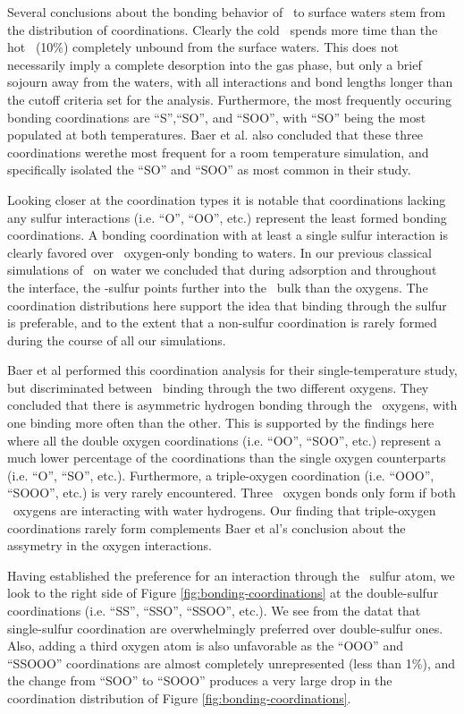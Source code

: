 	Several conclusions about the bonding behavior of \suldiox~to surface waters stem from the distribution of coordinations. Clearly the cold \suldiox~spends more time than the hot \suldiox~(10\%) completely unbound from the surface waters. This does not necessarily imply a complete desorption into the gas phase, but only a brief sojourn away from the waters, with all interactions and bond lengths longer than the cutoff criteria set for the analysis. Furthermore, the most frequently occuring bonding coordinations are ``S'',``SO'', and ``SOO'', with ``SO'' being the most populated at both temperatures. Baer et al. also concluded that these three coordinations werethe most frequent for a room temperature simulation, and specifically isolated the ``SO'' and ``SOO'' as most common in their study.\cite{Baer2010}

	Looking closer at the coordination types it is notable that coordinations lacking any sulfur interactions (i.e. ``O'', ``OO'', etc.) represent the least formed bonding coordinations. A bonding coordination with at least a single sulfur interaction is clearly favored over \suldiox~oxygen-only bonding to waters. In our previous classical simulations of \suldiox~on water we concluded that during adsorption and throughout the interface, the \suldiox-sulfur points further into the \wat~bulk than the oxygens.\cite{Shamay2011} The coordination distributions here support the idea that binding through the sulfur is preferable, and to the extent that a non-sulfur coordination is rarely formed during the course of all our simulations.

Baer et al performed this coordination analysis for their single-temperature study, but discriminated between \suldiox~binding through the two different oxygens. They concluded that there is asymmetric hydrogen bonding through the \suldiox~oxygens, with one binding more often than the other. This is supported by the findings here where all the double oxygen coordinations (i.e. ``OO'', ``SOO'', etc.) represent a much lower percentage of the coordinations than the single oxygen counterparts (i.e. ``O'', ``SO'', etc.). Furthermore, a triple-oxygen coordination (i.e. ``OOO'', ``SOOO'', etc.) is very rarely encountered. Three \suldiox~oxygen bonds only form if both \suldiox~oxygens are interacting with water hydrogens. Our finding that triple-oxygen coordinations rarely form complements Baer et al's conclusion about the assymetry in the oxygen interactions.

Having established the preference for an interaction through the \suldiox~sulfur atom, we look to the right side of Figure \ref{fig:bonding-coordinations} at the double-sulfur coordinations (i.e. ``SS'', ``SSO'', ``SSOO'', etc.). We see from the datat that single-sulfur coordination are overwhelmingly preferred over double-sulfur ones. Also, adding a third oxygen atom is also unfavorable as the ``OOO'' and ``SSOOO'' coordinations are almost completely unrepresented (less than 1\%), and the change from ``SOO'' to ``SOOO'' produces a very large drop in the coordination distribution of Figure \ref{fig:bonding-coordinations}.


